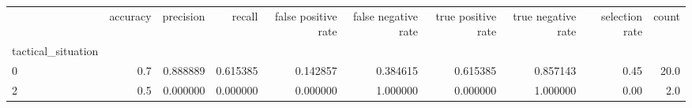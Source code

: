 \begin{tabular}{lrrrrrrrrr}
\toprule
{} &  accuracy &  precision &    recall &  false positive rate &  false negative rate &  true positive rate &  true negative rate &  selection rate &  count \\
tactical\_situation &           &            &           &                      &                      &                     &                     &                 &        \\
\midrule
0                  &       0.7 &   0.888889 &  0.615385 &             0.142857 &             0.384615 &            0.615385 &            0.857143 &            0.45 &   20.0 \\
2                  &       0.5 &   0.000000 &  0.000000 &             0.000000 &             1.000000 &            0.000000 &            1.000000 &            0.00 &    2.0 \\
\bottomrule
\end{tabular}

